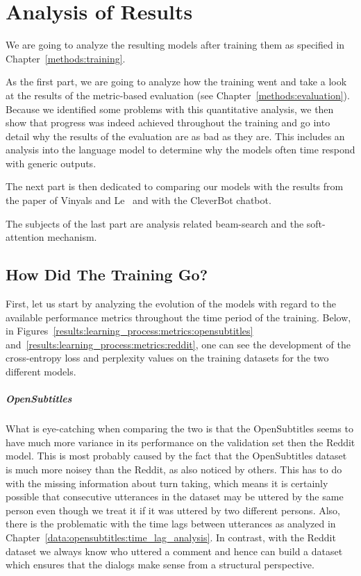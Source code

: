 \chapter{Analysis of Results}
We are going to analyze the resulting models after training them as specified in Chapter~\ref{methods:training}.

As the first part, we are going to analyze how the training went and take a look at the results of the metric-based evaluation (see Chapter~\ref{methods:evaluation}). Because we identified some problems with this quantitative analysis, we then show that progress was indeed achieved throughout the training and go into detail why the results of the evaluation are as bad as they are. This includes an analysis into the language model to determine why the models often time respond with generic outputs.

The next part is then dedicated to comparing our models with the results from the paper of Vinyals and Le~\cite{Vinyals:2015} and with the CleverBot chatbot.

The subjects of the last part are analysis related beam-search and the soft-attention mechanism.

\section{How Did The Training Go?}
First, let us start by analyzing the evolution of the models with regard to the available performance metrics throughout the time period of the training. Below, in Figures~\ref{results:learning_process:metrics:opensubtitles} and~\ref{results:learning_process:metrics:reddit}, one can see the development of the cross-entropy loss and perplexity values on the training datasets for the two different models.

\paragraph{OpenSubtitles} What is eye-catching when comparing the two is that the OpenSubtitles seems to have much more variance in its performance on the validation set then the Reddit model. This is most probably caused by the fact that the OpenSubtitles dataset is much more noisey than the Reddit, as also noticed by others\cite{Vinyals:2015}. This has to do with the missing information about turn taking, which means it is certainly possible that consecutive utterances in the dataset may be uttered by the same person even though we treat it if it was uttered by two different persons. Also, there is the problematic with the time lags between utterances as analyzed in Chapter~\ref{data:opensubtitles:time_lag_analysis}. In contrast, with the Reddit dataset we always know who uttered a comment and hence can build a dataset which ensures that the dialogs make sense from a structural perspective.

